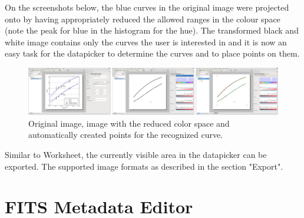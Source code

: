 On the screenshots below, the blue curves in the original image were projected onto by having appropriately reduced the allowed ranges in the colour space (note the peak for blue in the histogram for the hue).
The transformed black and white image contains only the curves the user is interested in and it is now an easy task for the datapicker to determine the curves and to place points on them.
\begin{figure}
\includegraphics[width=\textwidth]{images/datapicker_original_transformed_segments.png}
\caption{Original image, image with the reduced color space and automatically created points for the recognized curve.}
\end{figure}

Similar to Worksheet, the currently visible area in the datapicker can be exported. The supported image formats as described in the section "Export".


\section{FITS Metadata Editor}
